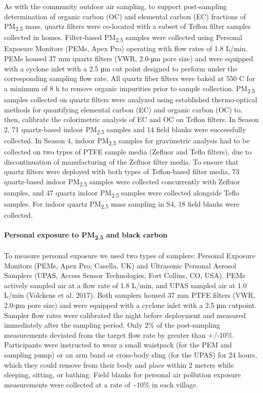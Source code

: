 \documentclass[
  letterpaper,
  DIV=11,
  numbers=noendperiod]{scrartcl}
\let\oldparagraph\paragraph
\renewcommand{\paragraph}[1]{\oldparagraph{#1}\mbox{}}
\begin{document}
As with the community outdoor air sampling, to support post-sampling
determination of organic carbon (OC) and elemental carbon (EC) fractions
of PM\textsubscript{2.5} mass, quartz filters were co-located with a
subset of Teflon filter samples collected in homes. Filter-based
PM\textsubscript{2.5} samples were collected using Personal Exposure
Monitors (PEMs, Apex Pro) operating with flow rates of 1.8 L/min. PEMs
housed 37 mm quartz filters (VWR, 2.0-μm pore size) and were equipped
with a cyclone inlet with a 2.5 μm cut point designed to perform under
the corresponding sampling flow rate. All quartz fiber filters were
baked at 550 C for a minimum of 8 h to remove organic impurities prior
to sample collection. PM\textsubscript{2.5} samples collected on quartz
filters were analyzed using established thermo-optical methods for
quantifying elemental carbon (EC) and organic carbon (OC) to, then,
calibrate the colorimetric analysis of EC and OC on Teflon filters. In
Season 2, 71 quartz-based indoor PM\textsubscript{2.5} samples and 14
field blanks were successfully collected. In Season 4, indoor
PM\textsubscript{2.5} samples for gravimetric analysis had to be
collected on two types of PTFE sample media (Zefluor and Teflo filters),
due to discontinuation of manufacturing of the Zefluor filter media. To
ensure that quartz filters were deployed with both types of Teflon-based
filter media, 73 quartz-based indoor PM\textsubscript{2.5} samples were
collected concurrently with Zefluor samples, and 47 quartz indoor
PM\textsubscript{2.5} samples were collected alongside Teflo samples.
For indoor quartz PM\textsubscript{2.5} mass sampling in S4, 18 field
blanks were collected.

\hypertarget{personal-exposure-to-pm2.5-and-black-carbon}{%
\paragraph{\texorpdfstring{Personal exposure to PM\textsubscript{2.5}
and black
carbon}{Personal exposure to PM2.5 and black carbon}}\label{personal-exposure-to-pm2.5-and-black-carbon}}

To measure personal exposure we used two types of samplers: Personal
Exposure Monitors (PEMs, Apex Pro; Casella, UK) and Ultrasonic Personal
Aerosol Samplers (UPAS, Access Sensor Technologies, Fort Collins, CO,
USA). PEMs actively sampled air at a flow rate of 1.8 L/min, and UPAS
sampled air at 1.0 L/min (Volckens et al. 2017). Both samplers housed 37
mm PTFE filters (VWR, 2.0-μm pore size) and were equipped with a cyclone
inlet with a 2.5 μm cutpoint. Sampler flow rates were calibrated the
night before deployment and measured immediately after the sampling
period. Only 2\% of the post-sampling measurements deviated from the
target flow rate by greater than +/-10\%. Participants were instructed
to wear a small waistpack (for the PEM and sampling pump) or an arm band
or cross-body sling (for the UPAS) for 24 hours, which they could remove
from their body and place within 2 meters while sleeping, sitting, or
bathing. Field blanks for personal air pollution exposure measurements
were collected at a rate of \textasciitilde10\% in each village.
\end{document}
